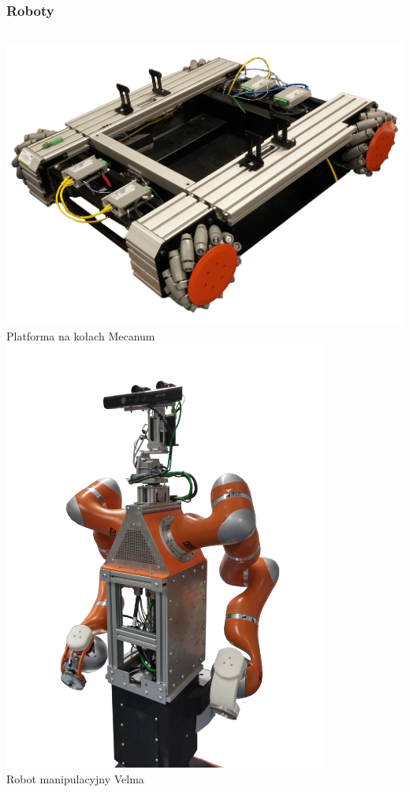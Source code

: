 \documentclass{beamer}
\begin{document}
	\begin{frame}
		\frametitle{Roboty}
		\begin{columns}[c]
			\centering
			\includegraphics[width=\textwidth]{graphics/omnivelma.png} \\
			Platforma na kołach Mecanum
			\centering
			\includegraphics[width=0.8\textwidth]{graphics/velma.png} \\
			Robot manipulacyjny Velma
		\end{columns}
	\end{frame}
	
\end{document}
